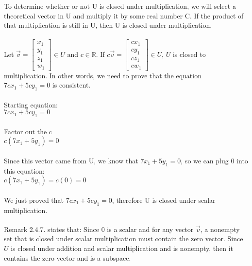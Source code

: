 \documentclass{article}
\begin{document}
To determine whether or not U is closed under multiplication, we will select a theoretical vector in U and multiply it by some real number C. If the product of that multiplication is still in U, then U is closed under multiplication. \\
\\
Let 
$\vec{v} = \left[\begin{matrix}x_{1}\\y_{1}\\z_{1}\\w_{1}\end{matrix}\right] \in U$ and 
$c \in \mathbb{R}$. If $c\vec{v} = \left[\begin{matrix}cx_{1}\\cy_{1}\\cz_{1}\\cw_{1}\end{matrix}\right] \in U$, $U$ is closed to multiplication. In other words, we need to prove that the equation $7cx_{1} + 5cy_{1} = 0$ is consistent.\\
\\
Starting equation:\\
$7cx_{1} + 5cy_{1} = 0$\\
\\
Factor out the c\\
$c(7x_{1} + 5y_{1}) = 0$\\
\\
Since this vector came from U, we know that $7x_{1} + 5y_{1} = 0$, so we can plug 0 into this equation:\\
$c(7x_{1} + 5y_{1}) = c(0) = 0$\\
\\
We just proved that  $7cx_{1} + 5cy_{1} = 0$, therefore U is closed under scalar multiplication.\\
\\
 Remark 2.4.7. states that: Since 0 is a scalar and for any vector $\vec{v}$, a nonempty set that is closed under scalar multiplication must contain the zero vector. Since $U$ is closed under addition and scalar multiplication and is nonempty, then it contains the zero vector and is a subspace.\\
\end{document}
